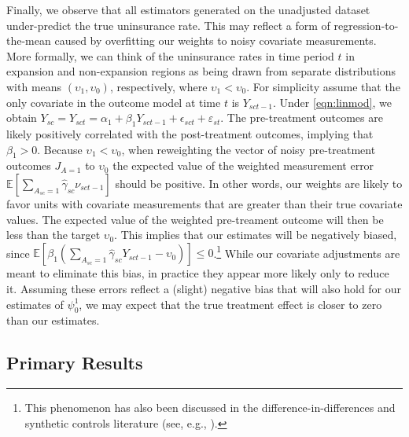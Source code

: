\documentclass[aoas]{imsart}
\theoremstyle{plain}
\theoremstyle{remark}
\begin{document}
Finally, we observe that all estimators generated on the unadjusted dataset under-predict the true uninsurance rate. This may reflect a form of regression-to-the-mean caused by overfitting our weights to noisy covariate measurements. More formally, we can think of the uninsurance rates in time period $t$ in expansion and non-expansion regions as being drawn from separate distributions with means $(\upsilon_1, \upsilon_0)$, respectively, where $\upsilon_1 < \upsilon_0$. For simplicity assume that the only covariate in the outcome model at time $t$ is $Y_{sct-1}$. Under \eqref{eqn:linmod}, we obtain $Y_{sc} = Y_{sct} = \alpha_1 + \beta_1Y_{sct-1} + \epsilon_{sct} + \varepsilon_{st}$. The pre-treatment outcomes are likely positively correlated with the post-treatment outcomes, implying that $\beta_1 > 0$. Because $\upsilon_1 < \upsilon_0$, when reweighting the vector of noisy pre-treatment outcomes $J_{A=1}$ to $\upsilon_0$ the expected value of the weighted measurement error $\mathbb{E}[\sum_{A_{sc} = 1}\hat{\gamma}_{sc}\nu_{sct-1}]$ should be positive. In other words, our weights are likely to favor units with covariate measurements that are greater than their true covariate values. The expected value of the weighted pre-treament outcome will then be less than the target $\upsilon_0$. This implies that our estimates will be negatively biased, since $\mathbb{E}[\beta_1(\sum_{A_{sc} = 1}\hat{\gamma}_{sc}Y_{sct-1} - \upsilon_0)] \le 0$.\footnote{This phenomenon has also been discussed in the difference-in-differences and synthetic controls literature (see, e.g., \cite{daw2018matching}).} While our covariate adjustments are meant to eliminate this bias, in practice they appear more likely only to reduce it. Assuming these errors reflect a (slight) negative bias that will also hold for our estimates of $\psi^1_0$, we may expect that the true treatment effect is closer to zero than our estimates. 

\subsection{Primary Results}
\end{document}
